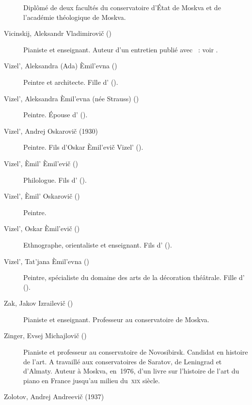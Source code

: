\begin{description}
 Diplômé de deux facultés du conservatoire d'\hbox{État} de Moskva et de
 l'académie théologique de Moskva.
 \item[Vicinskij, Aleksandr Vladimirovič (\Dates{1904}{1984})]%
 Pianiste et enseignant.
 Auteur d'un entretien publié avec \VSofronitsky{}~: voir
 \citet{Vitsinsky04, Vitsinsky}.
 \item[Vizel', Aleksandra (Ada) Èmil'evna (\Dates{1899}{1974})]%
 Peintre et architecte.
 Fille d'\EVizel{} ().
 \item[Vizel', Aleksandra Èmil'evna (née Strauss) (\Dates{1866}{1939})]%
 Peintre.
 Épouse d'\EVizel{} ().
 \item[Vizel', Andrej Oskarovič (1930\dvsborn{})]%
 Peintre.
 Fils d'\hbox{Oskar} Èmil'evič Vizel' ().
 \item[Vizel', Èmil' Èmil'evič (\Dates{1897}{1930})]%
 Philologue.
 Fils d'\EVizel{} ().
 \item[Vizel', Èmil' Oskarovič (\Dates{1866}{1943})]%
 Peintre.
 \item[Vizel', Oskar Èmil'evič (\Dates{1895}{1939})]%
 Ethnographe, orientaliste et enseignant.
 Fils d'\EVizel{} ().
 \item[Vizel', Tat'jana Èmil'evna (\Dates{1904}{1976})]%
 Peintre, spécialiste du domaine des arts de la décoration théâtrale.
 Fille d'\EVizel{} ().
 \item[Zak, Jakov Izrailevič (\Dates{1913}{1976})]%
 Pianiste et enseignant.
 Professeur au conservatoire de Moskva.
 \item[Zinger, Evsej Michajlovič (\Dates{1911}{1977})]%
 Pianiste et professeur au conservatoire de Novosibirsk.
 Candidat en histoire de l'art.
 A travaillé aux conservatoires de Saratov, de Leningrad et d'\hbox{Almaty}.
 Auteur à Moskva, en~1976, d'un livre sur l'histoire de l'art du piano en
 France jusqu'au milieu du~\textsc{xix}\ieme{} siècle.
 \item[Zolotov, Andrej Andreevič (1937\dvsborn{})]%

\end{description}

